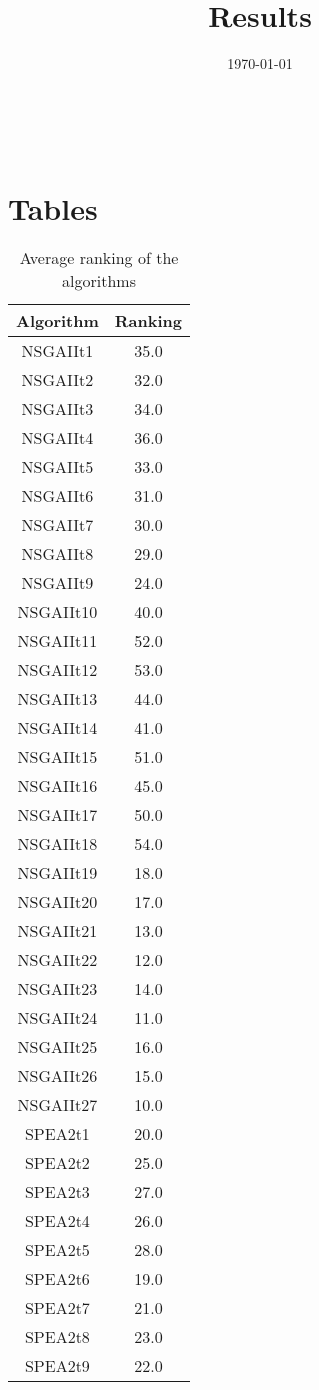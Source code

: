 \documentclass{article}
\title{Results}
\author{}
\date{\today}
\begin{document}
\oddsidemargin 0in \topmargin 0in\maketitle
\
\section{Tables}
\begin{table}[!htp]
\centering
\caption{Average ranking of the algorithms}
\begin{tabular}{c|c}
Algorithm&Ranking\\
\hline
NSGAIIt1&35.0\\
NSGAIIt2&32.0\\
NSGAIIt3&34.0\\
NSGAIIt4&36.0\\
NSGAIIt5&33.0\\
NSGAIIt6&31.0\\
NSGAIIt7&30.0\\
NSGAIIt8&29.0\\
NSGAIIt9&24.0\\
NSGAIIt10&40.0\\
NSGAIIt11&52.0\\
NSGAIIt12&53.0\\
NSGAIIt13&44.0\\
NSGAIIt14&41.0\\
NSGAIIt15&51.0\\
NSGAIIt16&45.0\\
NSGAIIt17&50.0\\
NSGAIIt18&54.0\\
NSGAIIt19&18.0\\
NSGAIIt20&17.0\\
NSGAIIt21&13.0\\
NSGAIIt22&12.0\\
NSGAIIt23&14.0\\
NSGAIIt24&11.0\\
NSGAIIt25&16.0\\
NSGAIIt26&15.0\\
NSGAIIt27&10.0\\
SPEA2t1&20.0\\
SPEA2t2&25.0\\
SPEA2t3&27.0\\
SPEA2t4&26.0\\
SPEA2t5&28.0\\
SPEA2t6&19.0\\
SPEA2t7&21.0\\
SPEA2t8&23.0\\
SPEA2t9&22.0\\

\end{tabular}
\end{table}
\end{document}
